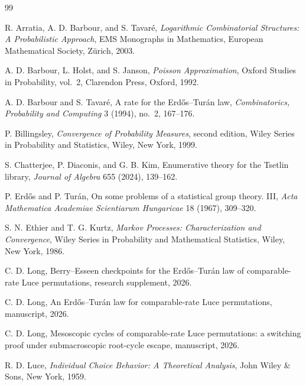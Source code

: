\documentclass[11pt]{article}
\theoremstyle{definition}
\theoremstyle{remark}
\begin{document}
\begin{thebibliography}{99}

R. Arratia, A. D. Barbour, and S. Tavar\'e,
\newblock \emph{Logarithmic Combinatorial Structures: A Probabilistic
Approach},
\newblock EMS Monographs in Mathematics, European Mathematical Society,
Z\"urich, 2003.

A. D. Barbour, L. Holst, and S. Janson,
\newblock \emph{Poisson Approximation},
\newblock Oxford Studies in Probability, vol.~2, Clarendon Press, Oxford,
1992.

A. D. Barbour and S. Tavar\'e,
\newblock A rate for the Erd\H{o}s--Tur\'an law,
\newblock \emph{Combinatorics, Probability and Computing} 3 (1994), no.~2,
167--176.

P. Billingsley,
\newblock \emph{Convergence of Probability Measures}, second edition,
\newblock Wiley Series in Probability and Statistics, Wiley, New York, 1999.

S. Chatterjee, P. Diaconis, and G. B. Kim,
\newblock Enumerative theory for the Tsetlin library,
\newblock \emph{Journal of Algebra} 655 (2024), 139--162.

P. Erd\H{o}s and P. Tur\'an,
\newblock On some problems of a statistical group theory. III,
\newblock \emph{Acta Mathematica Academiae Scientiarum Hungaricae} 18
(1967), 309--320.

S. N. Ethier and T. G. Kurtz,
\newblock \emph{Markov Processes: Characterization and Convergence},
\newblock Wiley Series in Probability and Mathematical Statistics, Wiley,
New York, 1986.

C. D. Long,
\newblock Berry--Esseen checkpoints for the Erd\H{o}s--Tur\'an law of
comparable-rate Luce permutations,
\newblock research supplement, 2026.

C. D. Long,
\newblock An Erd\H{o}s--Tur\'an law for comparable-rate Luce permutations,
\newblock manuscript, 2026.

C. D. Long,
\newblock Mesoscopic cycles of comparable-rate Luce permutations: a
switching proof under submacroscopic root-cycle escape,
\newblock manuscript, 2026.

R. D. Luce,
\newblock \emph{Individual Choice Behavior: A Theoretical Analysis},
\newblock John Wiley \& Sons, New York, 1959.

\end{thebibliography}
\end{document}
